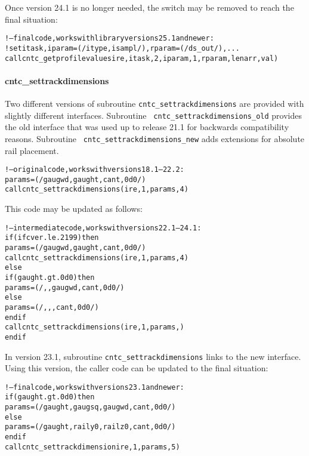\documentclass[12pt]{report}
\begin{document}
Once version 24.1 is no longer needed, the switch may be removed to reach
the final situation:

{\scriptsize\begin{alltt}
!--final code, works with library versions 25.1 and newer:
   ! set itask, iparam = (/ itype, isampl /), rparam = (/ ds_out /), ...
   call cntc_getprofilevalues\red{(}ire, itask, 2, iparam, 1, rparam, lenarr, val) 
\end{alltt}}

\paragraph{cntc\_settrackdimensions}

Two different versions of subroutine {\tt cntc\_settrackdimensions} are
provided with slightly different interfaces. Subroutine {\tt
cntc\_settrackdimensions\_old} provides the old interface that was used up
to release 21.1 for backwards compatibility reasons. Subroutine {\tt
cntc\_settrackdimensions\_new} adds extensions for absolute rail placement.

{\scriptsize\begin{alltt}
!--original code, works with versions 18.1 -- 22.2:
   params = (/ gaugwd, gaught, cant, 0d0 /)
   call cntc_settrackdimensions(ire, 1, params, 4) 
\end{alltt}}

This code may be updated as follows:
{\scriptsize\begin{alltt}
!--intermediate code, works with versions 22.1 -- 24.1:
   if (ifcver.le.2199) then
      params = (/ gaugwd, gaught, cant, 0d0 /)
      call cntc_settrackdimensions(ire, 1, params, 4) 
   else
      if (gaught.gt.0d0) then
         params = (/ , , gaugwd, cant, 0d0 /)
      else
         params = (/ , , , cant, 0d0 /)
      endif
      call cntc_settrackdimensions(ire, 1, params, ) 
   endif
\end{alltt}}

In version 23.1, subroutine {\tt cntc\_settrackdimensions} links to the new
interface. Using this version, the caller code can be updated to the final
situation:

{\scriptsize\begin{alltt}
!--final code, works with versions 23.1 and newer:
   if (gaught.gt.0d0) then
      params = (/ gaught, gaugsq, gaugwd, cant, 0d0 /)
   else
      params = (/ gaught, raily0, railz0, cant, 0d0 /)
   endif
   call cntc_settrackdimensionire, 1, params, 5) 
\end{alltt}}
\end{document}
